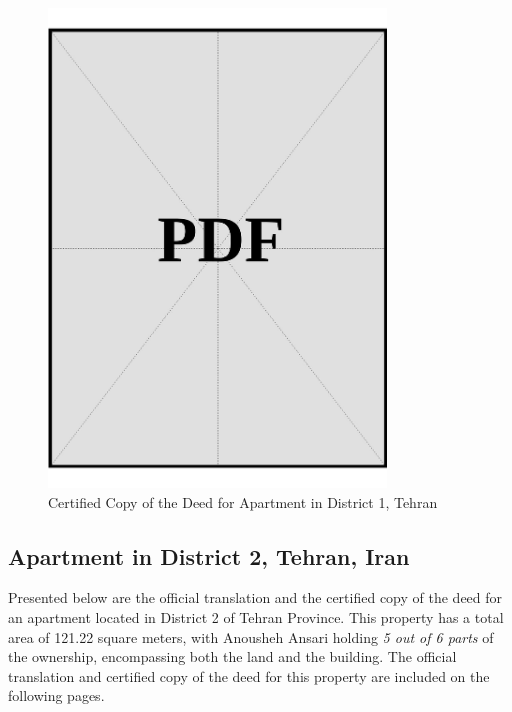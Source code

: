 \clearpage


\vspace*{\fill}
\begin{figure}[h]
    \centering
    \includegraphics[page=1, width=0.8\textwidth]{../application-docs/sponsor/funds/property-deeds/property-1/certified-copies.pdf}
    \caption{Certified Copy of the Deed for Apartment in District 1, Tehran}
    \label{fig:sponsor-apartment-dist1-tehran-certified-copy}
\end{figure}
\vspace*{\fill}

\clearpage

\subsection{Apartment in District 2, Tehran, Iran}\label{sec:sponsor-apartment-dist2-tehran}

Presented below are the official translation and the certified copy of the deed for an apartment located in District 2 of Tehran Province. This property has a total area of 121.22 square meters, with Anousheh Ansari holding \textit{5 out of 6 parts} of the ownership, encompassing both the land and the building. The official translation and certified copy of the deed for this property are included on the following pages.


